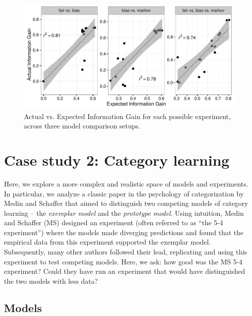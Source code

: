 \documentclass{article}
\begin{document}
\begin{figure}[t]
\centering
\includegraphics[width=0.7\columnwidth]{img/coin_eig_aig_scatter_noText.pdf}
\caption{Actual vs. Expected Information Gain for each possible experiment, across three model comparison setups.}
\label{fig:aig_vs_eig}
\end{figure}

\section{Case study 2: Category learning}

Here, we explore a more complex and realistic space of models and experiments.
In particular, we analyze a classic paper in the psychology of categorization by Medin and Schaffer \cite{medin78:pr} that aimed to distinguish two competing models of category learning -- the \emph{exemplar model} and the \emph{prototype model}.
Using intuition, Medin and Schaffer (MS) designed an experiment (often referred to as ``the 5-4 experiment'') where the models made diverging predictions and found that the empirical data from this experiment supported the exemplar model.
Subsequently, many other authors followed their lead, replicating and using this experiment to test competing models.
Here, we ask: how good was the MS 5-4 experiment?
Could they have run an experiment that would have distinguished the two models with less data?




\subsection{Models}
\end{document}
